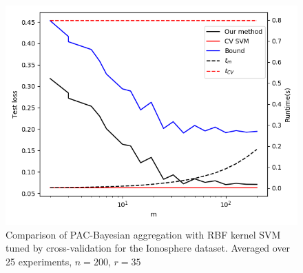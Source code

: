 \documentclass[a4paper]{article}
\begin{document}
\newpage
\vspace*{\fill}
\begin{figure}[H]
  \centering
  \includegraphics[width=\textwidth]{code/plt_avg25_1}
  \caption{Comparison of PAC-Bayesian aggregation with RBF kernel SVM
    tuned by cross-validation for the Ionosphere dataset. Averaged over 25 experiments, $n=200$, $r=35$}
  \label{plt1}
\end{figure}
\vspace*{\fill}
\end{document}
